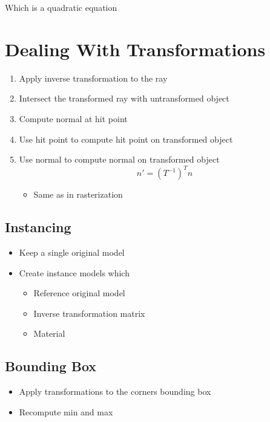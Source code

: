   Which is a quadratic equation

\section{Dealing With Transformations}

  \begin{enumerate}
    \item Apply inverse transformation to the ray
    \item Intersect the transformed ray with untransformed object
    \item Compute normal at hit point
    \item Use hit point to compute hit point on transformed object
    \item Use normal to compute normal on transformed object
    \begin{equation}
      n' = \left( T^{-1} \right)^{T} n
    \end{equation}
    \begin{itemize}
      \item Same as in rasterization
    \end{itemize}
  \end{enumerate}

  \subsection{Instancing}

    \begin{itemize}
      \item Keep a single original model
      \item Create instance models which
      \begin{itemize}
        \item Reference original model
        \item Inverse transformation matrix
        \item Material
      \end{itemize}
    \end{itemize}

  \subsection{Bounding Box}

    \begin{itemize}
      \item Apply transformations to the corners bounding box
      \item Recompute min and max
    \end{itemize}
